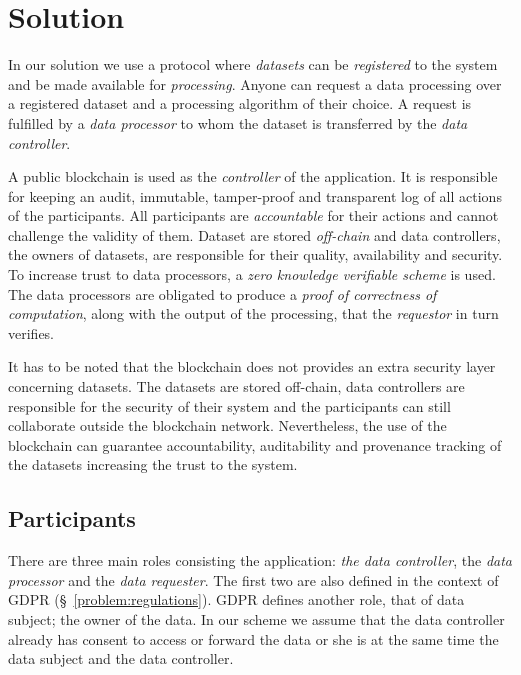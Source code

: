 \chapter{Solution}
\label{solution}

In our solution we use a protocol where \textit{datasets} can be \textit{registered} to the system and be made available for \textit{processing}. Anyone can request a data processing over a registered dataset and a processing algorithm of their choice. A request is fulfilled by a \textit{data processor} to whom the dataset is transferred by the \textit{data controller}.

A public blockchain is used as the \textit{controller} of the application. It is responsible for keeping an audit, immutable, tamper-proof and transparent log of all actions of the participants. All participants are \textit{accountable} for their actions and cannot challenge the validity of them. Dataset are stored \textit{off-chain} and data controllers, the owners of datasets, are responsible for their quality, availability and security. To increase trust to data processors, a \textit{zero knowledge verifiable scheme} is used. The data processors are obligated to produce a \textit{proof of correctness of computation}, along with the output of the processing, that the \textit{requestor} in turn verifies.

It has to be noted that the blockchain does not provides an extra security layer concerning datasets. The datasets are stored off-chain, data controllers are responsible for the security of their system and the participants can still collaborate outside the blockchain network. Nevertheless, the use of the blockchain can guarantee accountability, auditability and provenance tracking of the datasets increasing the trust to the system.

\section{Participants}
\label{solution:entities}

There are three main roles consisting the application: \textit{the data controller}, the \textit{data processor} and the \textit{data requester}. The first two are also defined in the context of GDPR (§~\ref{problem:regulations}).
GDPR defines another role, that of data subject; the owner of the data.
In our scheme we assume that the data controller already has consent to access or forward the data or she is at the same time the data subject and the data controller.

